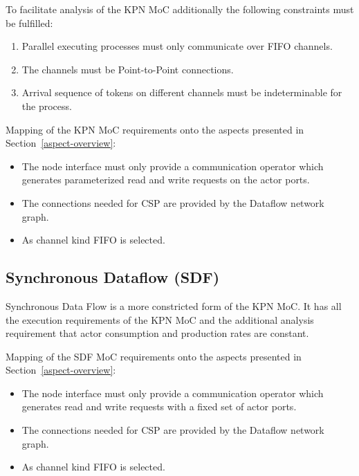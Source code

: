 To facilitate analysis of the KPN MoC additionally the following
constraints must be fulfilled:
\begin{enumerate}
\item Parallel executing processes must only communicate over FIFO channels.
\item The channels must be Point-to-Point connections.
\item Arrival sequence of tokens on different channels must be indeterminable
      for the process.
\end{enumerate}

Mapping of the KPN MoC requirements onto the aspects presented in
Section~\ref{aspect-overview}:

\begin{itemize}

\item The node interface must only provide a communication operator which
      generates parameterized read and write requests on the actor ports.

\item The connections needed for CSP are provided by the Dataflow network graph.

\item As channel kind FIFO is selected.

\end{itemize}

\subsection{Synchronous Dataflow (SDF)}
Synchronous Data Flow \cite{Lee87b:1987}
is a more constricted form of the KPN MoC.
It has all the execution requirements of the KPN MoC and
the additional analysis requirement that actor consumption and
production rates are constant.

Mapping of the SDF MoC requirements onto the aspects presented in
Section~\ref{aspect-overview}:

\begin{itemize}

\item The node interface must only provide a communication operator which
      generates read and write requests with a fixed set of actor ports.

\item The connections needed for CSP are provided by the Dataflow network graph.

\item As channel kind FIFO is selected.

\end{itemize}

